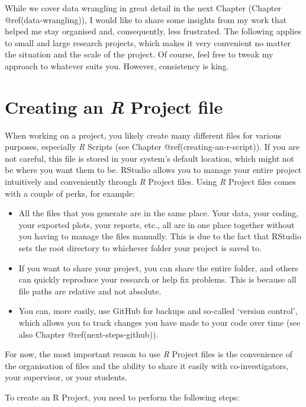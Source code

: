 \documentclass[
  letterpaper,
]{krantz}
\begin{document}
While we cover data wrangling in great detail in the next Chapter
(Chapter @ref(data-wrangling)), I would like to share some insights from
my work that helped me stay organised and, consequently, less
frustrated. The following applies to small and large research projects,
which makes it very convenient no matter the situation and the scale of
the project. Of course, feel free to tweak my approach to whatever suits
you. However, consistency is king.

\section{\texorpdfstring{Creating an \emph{R} Project
file}{Creating an R Project file}}\label{creating-an-r-project}

When working on a project, you likely create many different files for
various purposes, especially \emph{R} Scripts (see Chapter
@ref(creating-an-r-script)). If you are not careful, this file is stored
in your system's default location, which might not be where you want
them to be. RStudio allows you to manage your entire project intuitively
and conveniently through \emph{R} Project files. Using \emph{R} Project
files comes with a couple of perks, for example:

\begin{itemize}
\item
  All the files that you generate are in the same place. Your data, your
  coding, your exported plots, your reports, etc., all are in one place
  together without you having to manage the files manually. This is due
  to the fact that RStudio sets the root directory to whichever folder
  your project is saved to.
\item
  If you want to share your project, you can share the entire folder,
  and others can quickly reproduce your research or help fix problems.
  This is because all file paths are relative and not absolute.
\item
  You can, more easily, use GitHub for backups and so-called `version
  control', which allows you to track changes you have made to your code
  over time (see also Chapter @ref(next-steps-github)).
\end{itemize}

For now, the most important reason to use \emph{R} Project files is the
convenience of the organisation of files and the ability to share it
easily with co-investigators, your supervisor, or your students.

To create an R Project, you need to perform the following steps:
\end{document}
